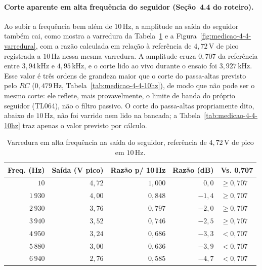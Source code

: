\documentclass[11pt,a4paper]{article}
\begin{document}
\paragraph{Corte aparente em alta frequência do seguidor (Seção~4.4 do roteiro).} Ao subir a frequência bem além de \(10\,\text{Hz}\), a amplitude na saída do seguidor também cai, como mostra a varredura da Tabela~\ref{tab:medicao-4-4-varredura} e a Figura~\ref{fig:medicao-4-4-varredura}, com a razão calculada em relação à referência de \(4{,}72\,\text{V}\) de pico registrada a \(10\,\text{Hz}\) nessa mesma varredura. A amplitude cruza \(0{,}707\) da referência entre \(3{,}94\,\text{kHz}\) e \(4{,}95\,\text{kHz}\), e o corte lido ao vivo durante o ensaio foi \(3{,}927\,\text{kHz}\). Esse valor é três ordens de grandeza maior que o corte do passa-altas previsto pelo \(RC\) (\(0{,}479\,\text{Hz}\), Tabela~\ref{tab:medicao-4-4-10hz}), de modo que não pode ser o mesmo corte: ele reflete, mais provavelmente, o limite de banda do próprio seguidor (TL064), não o filtro passivo. O corte do passa-altas propriamente dito, abaixo de \(10\,\text{Hz}\), não foi varrido nem lido na bancada; a Tabela~\ref{tab:medicao-4-4-10hz} traz apenas o valor previsto por cálculo.

\begin{table}[H]
\centering
\caption{Varredura em alta frequência na saída do seguidor, referência de \(4{,}72\,\text{V}\) de pico em \(10\,\text{Hz}\).}
\label{tab:medicao-4-4-varredura}
\begin{tabular}{@{}rrrrl@{}}
\toprule
\textbf{Freq. (Hz)} & \textbf{Saída (V pico)} & \textbf{Razão p/ 10\,Hz} & \textbf{Razão (dB)} & \textbf{Vs. 0,707} \\
\midrule
\(10\) & \(4{,}72\) & \(1{,}000\) & \(0{,}0\) & \(\geq 0{,}707\) \\
\(1\,930\) & \(4{,}00\) & \(0{,}848\) & \(-1{,}4\) & \(\geq 0{,}707\) \\
\(2\,930\) & \(3{,}76\) & \(0{,}797\) & \(-2{,}0\) & \(\geq 0{,}707\) \\
\(3\,940\) & \(3{,}52\) & \(0{,}746\) & \(-2{,}5\) & \(\geq 0{,}707\) \\
\(4\,950\) & \(3{,}24\) & \(0{,}686\) & \(-3{,}3\) & \(< 0{,}707\) \\
\(5\,880\) & \(3{,}00\) & \(0{,}636\) & \(-3{,}9\) & \(< 0{,}707\) \\
\(6\,940\) & \(2{,}76\) & \(0{,}585\) & \(-4{,}7\) & \(< 0{,}707\) \\
\bottomrule
\end{tabular}
\end{table}
\end{document}
